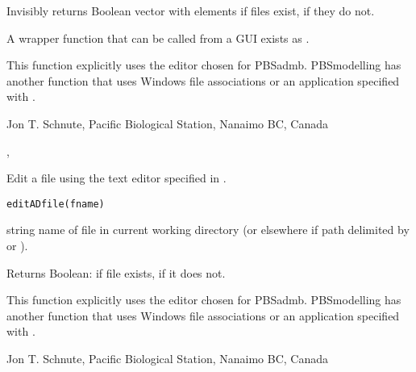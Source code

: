 \documentclass[letterpaper]{book}
\begin{document}
%
\begin{Value}
Invisibly returns Boolean vector with elements  if files exist, 
 if they do not.
\end{Value}
%
\begin{Note}\relax
A wrapper function that can be called from a GUI exists as .

This function explicitly uses the editor chosen for PBSadmb. PBSmodelling
has another function  that uses Windows file associations
or an application specified with .
\end{Note}
%
\begin{Author}\relax
 Jon T. Schnute, Pacific Biological Station, Nanaimo BC, Canada 
\end{Author}
%
\begin{SeeAlso}\relax
{}, 
\end{SeeAlso}
%
\begin{Description}\relax
Edit a file using the text editor specified in .
\end{Description}
%
\begin{Usage}
\begin{verbatim}
editADfile(fname)
\end{verbatim}
\end{Usage}
%
\begin{Arguments}
\begin{ldescription}
\item[\code{fname}] string name of file in current working directory
(or elsewhere if path delimited by \code{/} or \code{\bsl{}}).
\end{ldescription}
\end{Arguments}
%
\begin{Value}
Returns Boolean:  if file exists,  if it does not.
\end{Value}
%
\begin{Note}\relax
This function explicitly uses the editor chosen for PBSadmb. PBSmodelling
has another function  that uses Windows file associations
or an application specified with .
\end{Note}
%
\begin{Author}\relax
 Jon T. Schnute, Pacific Biological Station, Nanaimo BC, Canada 
\end{Author}
\end{document}
